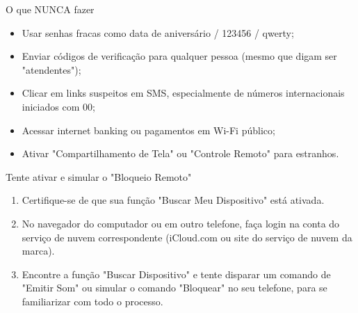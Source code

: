 \begin{tcbwarn}{O que NUNCA fazer}
\begin{itemize}
  \item Usar senhas fracas como data de aniversário / 123456 / qwerty;
  \item Enviar códigos de verificação para qualquer pessoa (mesmo que digam ser "atendentes");
  \item Clicar em links suspeitos em SMS, especialmente de números internacionais iniciados com 00;
  \item Acessar internet banking ou pagamentos em Wi-Fi público;
  \item Ativar "Compartilhamento de Tela" ou "Controle Remoto" para estranhos.
\end{itemize}

\end{tcbwarn}

\begin{tcbpractice}{Tente ativar e simular o "Bloqueio Remoto"}
\begin{enumerate}
  \item Certifique-se de que sua função "Buscar Meu Dispositivo" está ativada.
  \item No navegador do computador ou em outro telefone, faça login na conta do serviço de nuvem correspondente (iCloud.com ou site do serviço de nuvem da marca).
  \item Encontre a função "Buscar Dispositivo" e tente disparar um comando de "Emitir Som" ou simular o comando "Bloquear" no seu telefone, para se familiarizar com todo o processo.
\end{enumerate}

\end{tcbpractice}

